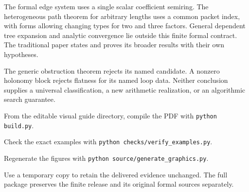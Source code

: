 The formal edge system uses a single scalar coefficient semiring. The heterogeneous path theorem for arbitrary lengths uses a common packet index, with forms allowing changing types for two and three factors. General dependent tree expansion and analytic convergence lie outside this finite formal contract. The traditional paper states and proves its broader results with their own hypotheses.

The generic obstruction theorem rejects its named candidate. A nonzero holonomy block rejects flatness for its named loop data. Neither conclusion supplies a universal classification, a new arithmetic realization, or an algorithmic search guarantee.

From the editable visual guide directory, compile the PDF with \mbox{\texttt{python build.py}}.\par
Check the exact examples with \mbox{\texttt{python checks/verify\_examples.py}}.\par
Regenerate the figures with \mbox{\texttt{python source/generate\_graphics.py}}.\par
Use a temporary copy to retain the delivered evidence unchanged. The full package preserves the finite release and its original formal sources separately.

